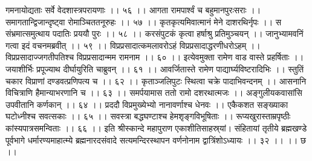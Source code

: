 गमनायोद्यताः सर्वे वेदशास्त्रपरायणाः ।। ५६ ।।
आगता रामपार्श्वं च बहुमानपुरःसराः ।।
समागतान्द्विजान्दृष्ट्वा रोमाञ्चिततनूरुहः ।। ५७ ।।
कृतकृत्यमिवात्मानं मेने दाशरथिर्नृपः ।।
स संभ्रमात्समुत्थाय पदातिः प्रययौ पुरः ।। ५८ ।।
करसंपुटकं कृत्वा हर्षाश्रु प्रतिमुञ्चयन् ।।
जानुभ्यामवनिं गत्वा इदं वचनमब्रवीत् ।। ५९ ।।
विप्रप्रसादात्कमलावरोऽहं विप्रप्रसादाद्धरणीधरोऽहम् ।।
विप्रप्रसादाज्जगतीपतिश्च विप्रप्रसादान्मम रामनाम ।। ६० ।।
इत्येवमुक्ता रामेण वाड वास्ते प्रहर्षिताः ।।
जयाशीर्भिः प्रपूज्याथ दीर्घायुरिति चाब्रुवन् ।। ६१ ।।
आवर्जितास्ते रामेण पाद्यार्घ्यविष्टरादिभिः ।।
स्तुतिं चकार विप्राणां दण्डवत्प्रणिपत्य च ।। ६२ ।।
कृताञ्जलिपुटः स्थित्वा चक्रे पादाभिवन्दनम् ।।
आसनानि विचित्राणि हैमान्याभरणानि च ।। ६३ ।।
समर्पयामास ततो रामो दशरथात्मजः ।।
अङ्गुलीयकवासांसि उपवीतानि कर्णकान् ।। ६४ ।।
प्रददौ विप्रमुख्येभ्यो नानावर्णाश्च धेनवः ।।
एकैकशत सङ्ख्याका घटोध्नीश्च सवत्सकाः ।। ६५ ।।
सवस्त्रा बद्धघण्टाश्च हेमशृङ्गविभूषिताः ।।
रूप्यखुरास्ताम्रपृष्ठीः कांस्यपात्रसमन्विताः ।। ६६ ।।
इति श्रीस्कान्दे महापुराण एकाशीतिसाहस्र्यां। संहितायां तृतीये ब्रह्मखण्डे पूर्वभागे धर्मारण्यमाहात्म्ये ब्रह्मनारदसंवादे सत्यमन्दिरस्थापन वर्णनोनाम द्वात्रिंशोऽध्यायः ।। ३२ ।। ।। छ ।।

